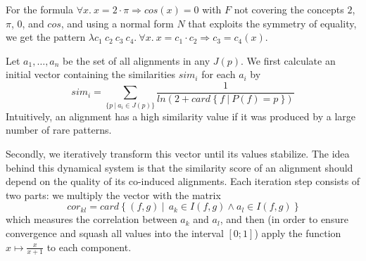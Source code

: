 \begin{example}
For the formula $\forall x.\ x = 2\cdot\pi \Rightarrow \textit{cos}(x) = 0$ with $F$ not covering the concepts $2$, $\pi$, $0$, and $\textit{cos}$,
and using a normal form $N$ that exploits the symmetry of equality, we get the pattern
$\lambda c_1\ c_2\ c_3\ c_4.\ \forall x.\ x = c_1 \cdot c_2 
\Rightarrow c_3 = c_4(x)$.
\end{example}

Let $a_1,\ldots,a_n$ be the set of all alignments in any $J(p)$.
We first calculate an initial vector containing the similarities $sim_i$ for each $a_i$ by
  \[ sim_i=
     \sum_{\{p \ |\ a_i \in J(p)\} } \frac{1}{\textit{ln} (2 + card\ \{\ f\ |\ P(f) 
  = 
  p\ \})} 
  \]
Intuitively, an alignment has a high similarity value if it was produced by a 
large number of rare patterns.

Secondly, we iteratively transform this vector until its values stabilize.
The idea behind this dynamical system is that the similarity score of an alignment should depend on the quality of its co-induced alignments.
Each iteration step consists of two parts:
we multiply the vector with the matrix
  \[ cor_{kl} =
     card\ \lbrace\ (f,g)\ |\ \ a_k \in I(f,g) \wedge a_l \in 
     I(f,g)\ \rbrace
  \]
which measures the correlation between $a_k$ and $a_l$, and then (in order to ensure convergence and squash all values into the interval $[0;1]$) apply the function $x\mapsto \frac{x}{x+1}$ to each component.


